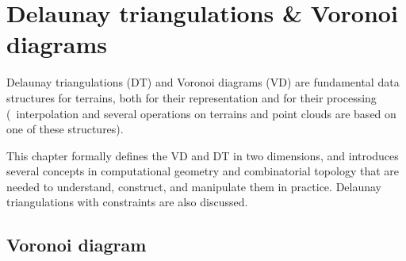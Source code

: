 
\setchapterpreamble[u]{\margintoc}
\graphicspath{{dtvd/figs/}}


\newcommand{\Orient}{O\textsc{rientation}\xspace}
\newcommand{\walk}{W\textsc{alk}\xspace}
\newcommand{\Incircle}{I\textsc{n}C\textsc{ircle}\xspace}

\chapter{Delaunay triangulations \& Voronoi diagrams}%
\label{chap:dtvd}

Delaunay triangulations (DT) and Voronoi diagrams (VD) are fundamental data structures for terrains, both for their representation and for their processing (\eg\ interpolation and several operations on terrains and point clouds are based on one of these structures).

%

This chapter formally defines the VD and DT in two dimensions, and introduces several concepts in computational geometry and combinatorial topology that are needed to understand, construct, and manipulate them in practice. 
Delaunay triangulations with constraints are also discussed.


\section{Voronoi diagram}%
\label{sec:vd}%

